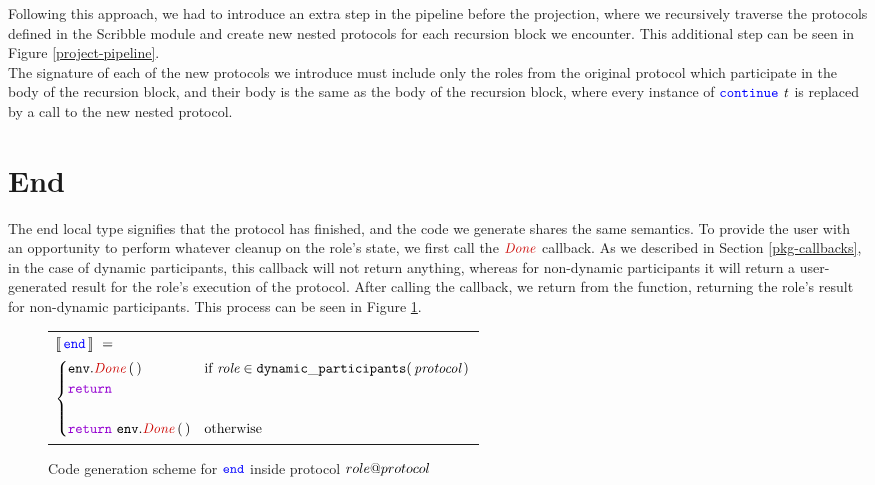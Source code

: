 \documentclass[12pt,twoside]{report}
\begin{document}
Following this approach, we had to introduce an extra step in the pipeline before the projection, where we recursively traverse the protocols defined in the Scribble module and create new nested protocols for each recursion block we encounter. This additional step can be seen in Figure \ref{project-pipeline}.\\

The signature of each of the new protocols we introduce must include only the roles from the original protocol which participate in the body of the recursion block, and their body is the same as the body of the recursion block, where every instance of ${\color{blue}\mathtt{continue}}\ \mathit{t}$ is replaced by a call to the new nested protocol.


\section{End}
The end local type signifies that the protocol has finished, and the code we generate shares the same semantics. To provide the user with an opportunity to perform whatever cleanup on the role's state, we first call the $\functionname{Done}$ callback. As we described in Section \ref{pkg-callbacks}, in the case of dynamic participants, this callback will not return anything, whereas for non-dynamic participants it will return a user-generated result for the role's execution of the protocol. After calling the callback, we return from the function, returning the role's result for non-dynamic participants. This process can be seen in Figure \ref{end-codegen}.

\begin{figure}[!h]
    \begin{center}
        \begin{tabular}{l}
            $\llbracket\,{\color{blue}\mathtt{end}}\,\rrbracket\ =\ $\\[3pt]
            \quad 
            \begin{math}
                \begin{cases}
                    \methodcall{\envparam}{Done}\,\emptyparams  & \text{if}\ \textit{role} \in \mathtt{dynamic\_participants}(\,\textit{protocol}\,)\\
                    \goreturn  & \\\\
                    \goreturn\ \methodcall{\envparam}{Done}\,\emptyparams & \text{otherwise}
                \end{cases}
            \end{math}
            
            
        \end{tabular}
    \end{center}
    \caption{Code generation scheme for ${\color{blue}\mathtt{end}}$ inside protocol ${role@protocol}$}
    \label{end-codegen}
\end{figure}
\end{document}
